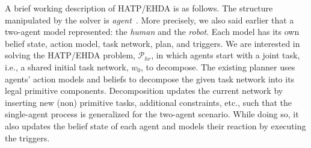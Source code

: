 \documentclass[letterpaper]{article} %
\begin{document}
A brief working description of HATP/EHDA is as follows. The structure manipulated by the solver is \textit{agent}~\cite{thesisBuisan21,buisan:hal-03684211}. More precisely, we also said earlier that a two-agent model represented: the \textit{human} and the \textit{robot}. 
Each model has its own belief state, action model, task network, plan, and triggers. We are interested in solving the HATP/EHDA problem, $\mathcal{P}_{hr}$, in which agents start with a joint task, i.e., a shared initial task network, $w_0$, to decompose.
The existing planner uses agents' action models and beliefs to decompose the given task network into its legal primitive components. 
Decomposition updates the current network by inserting new (non) primitive tasks, additional constraints, etc., such that the single-agent process is generalized for the two-agent scenario.
While doing so, it also updates the belief state of each agent and models their reaction by executing the triggers.


\end{document}
